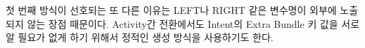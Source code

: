 첫 번째 방식이 선호되는 또 다른 이유는 LEFT나 RIGHT 같은 변수명이 외부에 노출되지 않는 장점 때문이다. 
Activity간 전환에서도 Intent의 Extra Bundle 키 값을 서로 알 필요가 없게 하기 위해서 정적인 생성 방식을 사용하기도 한다.

\begin{comment}
\section{AOP}

AOP를 굳이 설명은 하지 않고 아래 링크로 대체하겠습니다.
http://isstory83.tistory.com/90
 
 
 
안드로이드 캘린더앱에서는 적용 여부 검토 예정으로, 기본 테스트만 해본 상태입니다.
 
 
패스코드 적용하던 중에 고민을 해보았는데요.
상위에서 패스코드 관련 처리를 하는 상속구조로 하거나,
액티비티를 파라미터로 전달해서 Helper 클래스를 필요한 곳에서 매번 호출하거나 해야 합니다.
 
상속 구조는 상당히 문제가 많죠.. 본래 상속해야 하는 게 BaseOneActivity, BaseAnotherActivity가 각각 있었다면,
각각에다가 동일한 코드를 붙여줘야 하는 문제가 있어요.
상속 구조가 복잡한 프로젝트에서는 What the hell 이 될 수 있어요.
(제가 거쳐온 프로젝트에서는 네이버앱이 가장 상속 구조가 복잡했어요.)
 
Helper를 쓰면 그나마 나은 부분이 있지만, 열심히 코드마다 카피를 해줘야 하니까요.
이보다 나은 방법이 있을까 하다가 AOP 적용을 떠올려봤습니다.
 
웹개발 해보신 분들은 spring aop 써보신 분들 계실텐요. 이제는 기억도 가물하지만 쓸모가 많았어요.
로깅이나 속도 체크, 트랜잭션 등 반복되는 동일 로직을 매번 코드에 심지않고 Advice에 넣어서 실행 범위를 정해서 실행하도록 했죠.
 
 
spring aop 쓸때는 aspect compiler가 필요하진 않았는데(내부적으로 프락시를 만드는 형태인 경우. 이게 간편하니까요.), 
 
안드로이드에서 할 때는 aspect 컴파일러가 필요해집니다.
 
관련한 프로그램 설치 관련해서는  아래 페이지 참고하면 되고요. 
http://ecogeo.tistory.com/category/Android?page=3 
 
eclipse나 ant, maven 모두 지원 가능하므로 로컬 빌드 뿐만 아니라 CI 빌드도 문제는 없습니다.(서버에서 aspectj를 깔아야겠죠.)
 
처음 적용하려면 번거로움도 있고 이해하는 데 어려움은 있겠지만, 해놓고 나면 편리한 부분이 많을 듯 합니다.

스프링에서도 aspectj 와 함께 사용하는 것이 더 기능이 많다고 나오네요.
http://javajigi.net/pages/viewpage.action?pageId=1081
 
아래 링크들도 시간되면 함 보세요.
 
http://www.eclipse.org/aspectj/doc/next/adk15notebook/ataspectj.html
http://www.egovframe.go.kr/wiki/doku.php?id=egovframework:rte:fdl:aop:aspectj
\end{comment}

